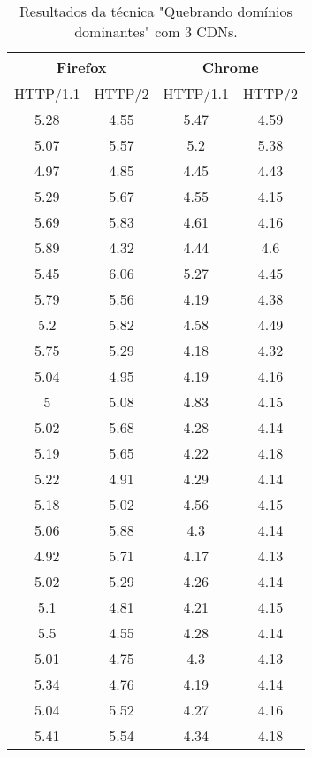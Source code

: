 \begin{table}[H]
	\centering
	\caption{Resultados da técnica "Quebrando domínios dominantes" com 3 CDNs.}
	\label{resultados-quebrandodominiosdominantes-3}
	\begin{tabular}{cccc}
		\hline
		\multicolumn{2}{c}{\textbf{Firefox}} & \multicolumn{2}{c}{\textbf{Chrome}} \\
		\hline
		HTTP/1.1 & HTTP/2 & HTTP/1.1 & HTTP/2 \\
		\hline
		5.28 & 4.55 & 5.47 & 4.59 \\
		5.07 & 5.57 & 5.2 & 5.38 \\
		4.97 & 4.85 & 4.45 & 4.43 \\
		5.29 & 5.67 & 4.55 & 4.15 \\
		5.69 & 5.83 & 4.61 & 4.16 \\
		5.89 & 4.32 & 4.44 & 4.6 \\
		5.45 & 6.06 & 5.27 & 4.45 \\
		5.79 & 5.56 & 4.19 & 4.38 \\
		5.2 & 5.82 & 4.58 & 4.49 \\
		5.75 & 5.29 & 4.18 & 4.32 \\
		5.04 & 4.95 & 4.19 & 4.16 \\
		5 & 5.08 & 4.83 & 4.15 \\
		5.02 & 5.68 & 4.28 & 4.14 \\
		5.19 & 5.65 & 4.22 & 4.18 \\
		5.22 & 4.91 & 4.29 & 4.14 \\
		5.18 & 5.02 & 4.56 & 4.15 \\
		5.06 & 5.88 & 4.3 & 4.14 \\
		4.92 & 5.71 & 4.17 & 4.13 \\
		5.02 & 5.29 & 4.26 & 4.14 \\
		5.1 & 4.81 & 4.21 & 4.15 \\
		5.5 & 4.55 & 4.28 & 4.14 \\
		5.01 & 4.75 & 4.3 & 4.13 \\
		5.34 & 4.76 & 4.19 & 4.14 \\
		5.04 & 5.52 & 4.27 & 4.16 \\
		5.41 & 5.54 & 4.34 & 4.18 \\
		\hline
	\end{tabular}
\end{table}